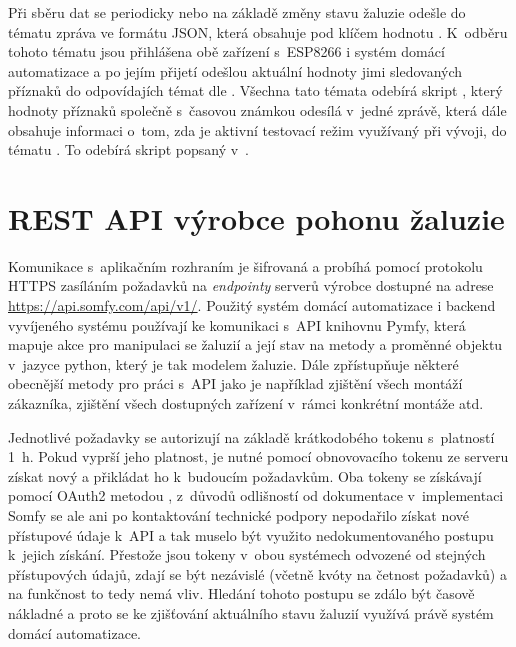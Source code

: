     Při sběru dat se periodicky nebo na základě změny stavu žaluzie odešle do tématu  zpráva ve formátu JSON, která obsahuje pod klíčem  hodnotu . K~odběru tohoto tématu jsou přihlášena obě zařízení s~ESP8266 i systém domácí automatizace a po jejím přijetí odešlou aktuální hodnoty jimi sledovaných příznaků do odpovídajích témat dle . Všechna tato témata odebírá skript , který hodnoty příznaků společně s~časovou známkou odesílá v~jedné zprávě, která dále obsahuje informaci o~tom, zda je aktivní testovací režim využívaný při vývoji, do tématu . To odebírá skript  popsaný v~.
  
  \section{REST API výrobce pohonu žaluzie}
    Komunikace s~aplikačním rozhraním je šifrovaná a probíhá pomocí protokolu HTTPS zasíláním požadavků na \emph{endpointy} serverů výrobce dostupné na adrese \href{https://api.somfy.com/api/v1/}{https://api.somfy.com/api/v1/}. Použitý systém domácí automatizace i backend vyvíjeného systému používají ke komunikaci s~API knihovnu Pymfy, která mapuje akce pro manipulaci se žaluzií a její stav na metody a proměnné objektu v~jazyce python, který je tak modelem žaluzie. Dále zpřístupňuje některé obecnější metody pro práci s~API jako je například zjištění všech montáží zákazníka, zjištění všech dostupných zařízení v~rámci konkrétní montáže atd.

    Jednotlivé požadavky se autorizují na základě krátkodobého tokenu s~platností 1~h. Pokud vyprší jeho platnost, je nutné pomocí obnovovacího tokenu ze serveru získat nový a přikládat ho k~budoucím požadavkům. Oba tokeny se získávají pomocí OAuth2 metodou , z~důvodů odlišností od dokumentace v~implementaci Somfy se ale ani po kontaktování technické podpory nepodařilo získat nové přístupové údaje k~API a tak muselo být využito nedokumentovaného postupu k~jejich získání. Přestože jsou tokeny v~obou systémech odvozené od stejných přístupových údajů, zdají se být nezávislé (včetně kvóty na četnost požadavků) a na funkčnost to tedy nemá vliv. Hledání tohoto postupu se zdálo být časově nákladné a proto se ke zjišťování aktuálního stavu žaluzií využívá právě systém domácí automatizace.

